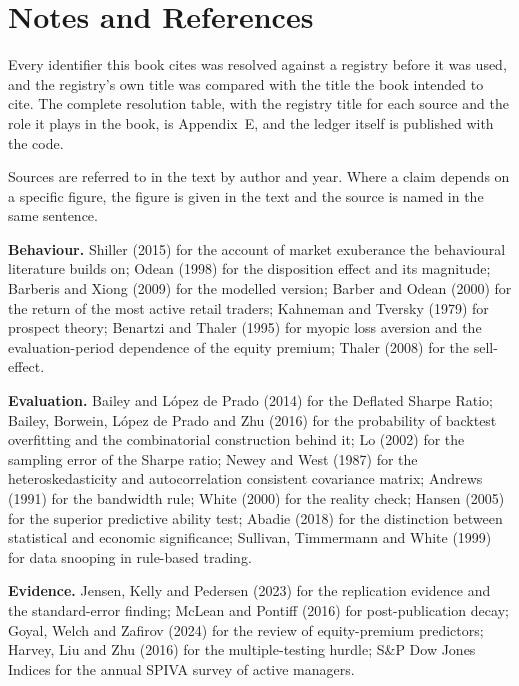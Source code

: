 \chapter*{Notes and References}
\thispagestyle{plain}

\noindent\small
Every identifier this book cites was resolved against a registry before it
was used, and the registry's own title was compared with the title the
book intended to cite. The complete resolution table, with the registry
title for each source and the role it plays in the book, is Appendix~E,
and the ledger itself is published with the code.

Sources are referred to in the text by author and year. Where a claim
depends on a specific figure, the figure is given in the text and the
source is named in the same sentence.

\vspace{6pt}
\noindent\textbf{Behaviour.} Shiller (2015) for the account of market
exuberance the behavioural literature builds on; Odean (1998) for the
disposition effect and its magnitude; Barberis and Xiong (2009) for the modelled version; Barber
and Odean (2000) for the return of the most active retail traders; Kahneman
and Tversky (1979) for prospect theory; Benartzi and Thaler (1995) for
myopic loss aversion and the evaluation-period dependence of the equity
premium; Thaler (2008) for the sell-effect.

\vspace{6pt}
\noindent\textbf{Evaluation.} Bailey and L\'opez de Prado (2014) for the
Deflated Sharpe Ratio; Bailey, Borwein, L\'opez de Prado and Zhu (2016) for
the probability of backtest overfitting and the combinatorial construction
behind it; Lo (2002) for the sampling error of the Sharpe ratio; Newey and
West (1987) for the heteroskedasticity and autocorrelation consistent
covariance matrix; Andrews (1991) for the bandwidth rule; White (2000) for
the reality check; Hansen (2005) for the superior predictive ability test;
Abadie (2018) for the distinction between statistical and economic
significance; Sullivan, Timmermann and White (1999) for data snooping in
rule-based trading.

\vspace{6pt}
\noindent\textbf{Evidence.} Jensen, Kelly and Pedersen (2023) for the
replication evidence and the standard-error finding; McLean and Pontiff
(2016) for post-publication decay; Goyal, Welch and Zafirov (2024) for the
review of equity-premium predictors; Harvey, Liu and Zhu (2016) for the
multiple-testing hurdle; S\&P Dow Jones Indices for the annual SPIVA
survey of active managers.

